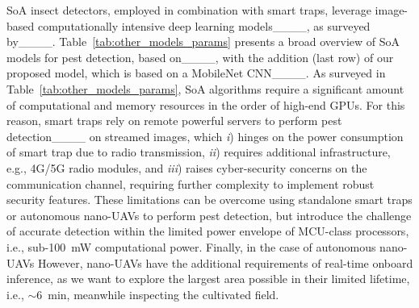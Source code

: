 SoA insect detectors, employed in combination with smart traps, leverage image-based computationally intensive deep learning models____, as surveyed by____.
Table~\ref{tab:other_models_params} presents a broad overview of SoA models for pest detection, based on____, with the addition (last row) of our proposed model, which is based on a MobileNet CNN____.
As surveyed in Table~\ref{tab:other_models_params}, SoA algorithms require a significant amount of computational and memory resources in the order of high-end GPUs.
For this reason, smart traps rely on remote powerful servers to perform pest detection____ on streamed images, which \textit{i}) hinges on the power consumption of smart trap due to radio transmission, \textit{ii}) requires additional infrastructure, e.g., 4G/5G radio modules, and \textit{iii}) raises cyber-security concerns on the communication channel, requiring further complexity to implement robust security features. 
These limitations can be overcome using standalone smart traps or autonomous nano-UAVs to perform pest detection, but introduce the challenge of accurate detection within the limited power envelope of MCU-class processors, i.e., sub-\SI{100}{\milli\watt} computational power.
Finally, in the case of autonomous nano-UAVs
However, nano-UAVs have the additional requirements of real-time onboard inference, as we want to explore the largest area possible in their limited lifetime, i.e., $\sim$\SI{6}{\minute}, meanwhile inspecting the cultivated field.

